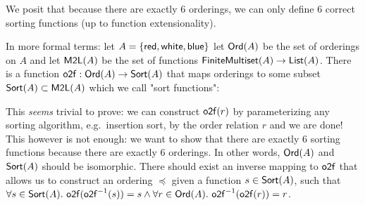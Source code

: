 We posit that because there are exactly 6 orderings, we can only define 6 correct sorting
functions (up to function extensionality).

In more formal terms: let $A = \{\operatorname{\mathsf{red}}, \operatorname{\mathsf{white}}, \operatorname{\mathsf{blue}}\}$
let $\operatorname{\mathsf{Ord}}(A)$ be the set of orderings on $A$ and let 
 $\operatorname{\mathsf{M2L}}(A)$  be the set of functions $\operatorname{\mathsf{FiniteMultiset}}(A) \to \operatorname{\mathsf{List}}(A)$.
There is a function $\operatorname{\mathsf{o2f}} : \operatorname{\mathsf{Ord}}(A) \to \operatorname{\mathsf{Sort}}(A)$ that maps orderings to
some subset $\operatorname{\mathsf{Sort}}(A) \subset \operatorname{\mathsf{M2L}}(A)$ which we call "sort functions":

\begin{center}
\end{center}

This \textit{seems} trivial to prove: we can construct $\operatorname{\mathsf{o2f}}(r)$ by parameterizing
any sorting algorithm, e.g.\ insertion sort, by the order relation $r$ and we are done!
This however is not enough: we want to show that there are exactly 6 sorting functions because
there are exactly 6 orderings. In other words, $\operatorname{\mathsf{Ord}}(A)$ and $\operatorname{\mathsf{Sort}}(A)$ should be
isomorphic. There should exist an inverse mapping to $\operatorname{\mathsf{o2f}}$ that allows us to construct
an ordering $\preccurlyeq$ given a function $s \in \operatorname{\mathsf{Sort}}(A)$, such that
$\forall s \in \operatorname{\mathsf{Sort}}(A).\, \operatorname{\mathsf{o2f}}(\operatorname{\mathsf{o2f}}^{-1}(s)) = s \land \forall r \in \operatorname{\mathsf{Ord}}(A).\, \operatorname{\mathsf{o2f}}^{-1}(\operatorname{\mathsf{o2f}}(r)) = r$.

